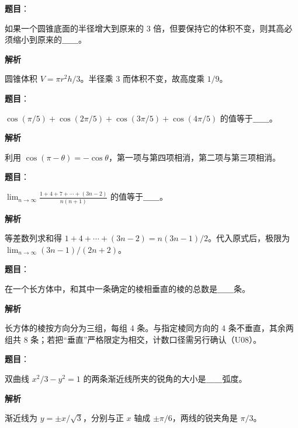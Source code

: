 \begin{answer}

\textbf{题目}：

如果一个圆锥底面的半径增大到原来的 3 倍，但要保持它的体积不变，则其高必须缩小到原来的＿＿。

\textbf{解析}

圆锥体积 $V=\pi r^2h/3$。半径乘 3 而体积不变，故高度乘 $1/9$。


\end{answer}
\begin{answer}

\textbf{题目}：

$\cos(\pi/5)+\cos(2\pi/5)+\cos(3\pi/5)+\cos(4\pi/5)$ 的值等于＿＿。

\textbf{解析}

利用 $\cos(\pi-\theta)=-\cos\theta$，第一项与第四项相消，第二项与第三项相消。


\end{answer}
\begin{answer}

\textbf{题目}：

$\displaystyle\lim_{n\to\infty}\frac{1+4+7+\cdots +(3n-2)}{n(n+1)}$ 的值等于＿＿。

\textbf{解析}

等差数列求和得 $1+4+\cdots +(3n-2)=n(3n-1)/2$。代入原式后，极限为 $\lim_{n\to\infty}(3n-1)/(2n+2)$。


\end{answer}
\begin{answer}

\textbf{题目}：

在一个长方体中，和其中一条确定的棱相垂直的棱的总数是＿＿条。

\textbf{解析}

长方体的棱按方向分为三组，每组 4 条。与指定棱同方向的 4 条不垂直，其余两组共 8 条；若把“垂直”严格限定为相交，计数口径需另行确认（U08）。


\end{answer}
\begin{answer}

\textbf{题目}：

双曲线 $x^2/3-y^2=1$ 的两条渐近线所夹的锐角的大小是＿＿弧度。

\textbf{解析}

渐近线为 $y=\pm x/\sqrt3$，分别与正 $x$ 轴成 $\pm\pi/6$，两线的锐夹角是 $\pi/3$。


\end{answer}
